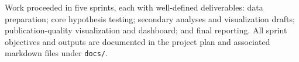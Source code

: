 Work proceeded in five sprints, each with well-defined deliverables: data preparation; core hypothesis testing; secondary analyses and visualization drafts; publication-quality visualization and dashboard; and final reporting. All sprint objectives and outputs are documented in the project plan and associated markdown files under \texttt{docs/}.
